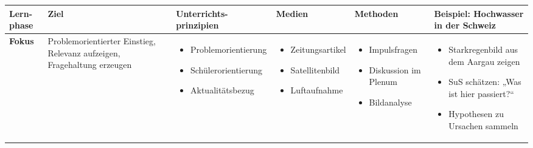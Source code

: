 \begin{table}[H]
  \footnotesize
  \begin{tabular}{>{\raggedright\arraybackslash}p{1.5cm}
    >{\raggedright\arraybackslash}p{2.5cm}
    >{\raggedright\arraybackslash}p{2.5cm}
    >{\raggedright\arraybackslash}p{2.5cm}
    >{\raggedright\arraybackslash}p{2.5cm}
    >{\raggedright\arraybackslash}p{3cm}}
    \textbf{Lern-\newline phase}                                                    &
    \textbf{Ziel}                                                                   &
    \textbf{Unterrichts-prinzipien}                                                 &
    \textbf{Medien}                                                                 &
    \textbf{Methoden}                                                               &
    \textbf{Beispiel: Hochwasser in der Schweiz}                                      \\
    \midrule
    \textbf{Fokus}                                                                  &
    Problemorientierter Einstieg, Relevanz aufzeigen, Fragehaltung erzeugen         &
    \begin{itemize}[leftmargin=*,nosep]
      \item Problemorientierung
      \item Schülerorientierung
      \item Aktualitätsbezug
    \end{itemize}                                             &
    \begin{itemize}[leftmargin=*,nosep]
      \item Zeitungsartikel
      \item Satellitenbild
      \item Luftaufnahme
    \end{itemize}                                             &
    \begin{itemize}[leftmargin=*,nosep]
      \item Impulsfragen
      \item Diskussion im Plenum
      \item Bildanalyse
    \end{itemize}                                             &
    \begin{itemize}[leftmargin=*,nosep]
      \item Starkregenbild aus dem Aargau zeigen
      \item SuS schätzen: „Was ist hier passiert?“
      \item Hypothesen zu Ursachen sammeln

\end{itemize}
\end{tabular}
\end{table}

